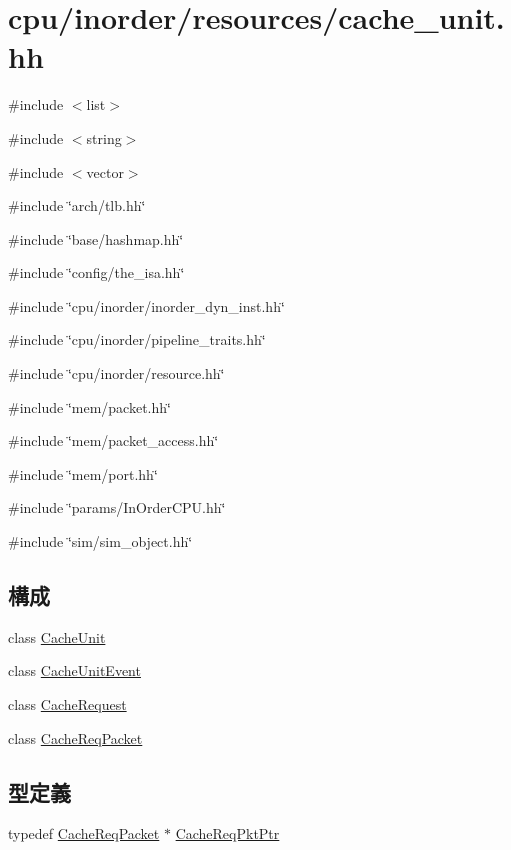 \hypertarget{cache__unit_8hh}{
\section{cpu/inorder/resources/cache\_\-unit.hh}
\label{cache__unit_8hh}
}
{\ttfamily \#include $<$list$>$}\par
{\ttfamily \#include $<$string$>$}\par
{\ttfamily \#include $<$vector$>$}\par
{\ttfamily \#include \char`\"{}arch/tlb.hh\char`\"{}}\par
{\ttfamily \#include \char`\"{}base/hashmap.hh\char`\"{}}\par
{\ttfamily \#include \char`\"{}config/the\_\-isa.hh\char`\"{}}\par
{\ttfamily \#include \char`\"{}cpu/inorder/inorder\_\-dyn\_\-inst.hh\char`\"{}}\par
{\ttfamily \#include \char`\"{}cpu/inorder/pipeline\_\-traits.hh\char`\"{}}\par
{\ttfamily \#include \char`\"{}cpu/inorder/resource.hh\char`\"{}}\par
{\ttfamily \#include \char`\"{}mem/packet.hh\char`\"{}}\par
{\ttfamily \#include \char`\"{}mem/packet\_\-access.hh\char`\"{}}\par
{\ttfamily \#include \char`\"{}mem/port.hh\char`\"{}}\par
{\ttfamily \#include \char`\"{}params/InOrderCPU.hh\char`\"{}}\par
{\ttfamily \#include \char`\"{}sim/sim\_\-object.hh\char`\"{}}\par
\subsection*{構成}
\begin{DoxyCompactItemize}
\item 
class \hyperlink{classCacheUnit}{CacheUnit}
\item 
class \hyperlink{classCacheUnitEvent}{CacheUnitEvent}
\item 
class \hyperlink{classCacheRequest}{CacheRequest}
\item 
class \hyperlink{classCacheReqPacket}{CacheReqPacket}
\end{DoxyCompactItemize}
\subsection*{型定義}
\begin{DoxyCompactItemize}
\item 
typedef \hyperlink{classCacheReqPacket}{CacheReqPacket} $\ast$ \hyperlink{cache__unit_8hh_aa87027cd980bef753db5680223be4acd}{CacheReqPktPtr}
\end{DoxyCompactItemize}



